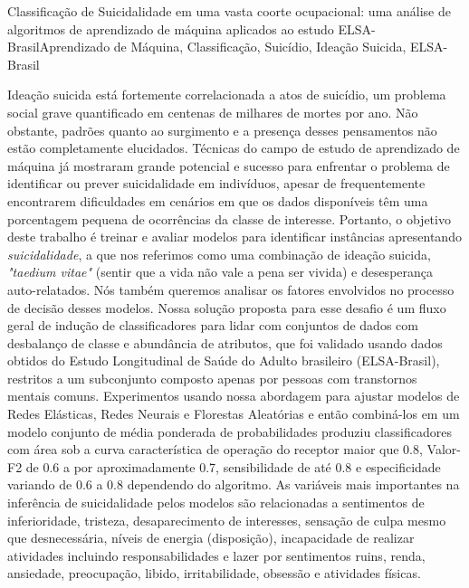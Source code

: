 \documentclass[ecp,tc,english]{iiufrgs}
\begin{document}
    \begin{englishabstract}{Classificação de Suicidalidade em uma vasta coorte ocupacional: uma análise de algoritmos de aprendizado de máquina aplicados ao estudo ELSA-Brasil}{Aprendizado de Máquina, Classificação, Suicídio, Ideação Suicida, ELSA-Brasil}

        Ideação suicida está fortemente correlacionada a atos de suicídio, um problema social grave quantificado em centenas de milhares de mortes por ano.
        Não obstante, padrões quanto ao surgimento e a presença desses pensamentos não estão completamente elucidados.
        Técnicas do campo de estudo de aprendizado de máquina já mostraram grande potencial e sucesso para enfrentar o problema de identificar ou prever suicidalidade em indivíduos, apesar de frequentemente encontrarem dificuldades em cenários em que os dados disponíveis têm uma porcentagem pequena de ocorrências da classe de interesse.
        Portanto, o objetivo deste trabalho é treinar e avaliar modelos para identificar instâncias apresentando \textit{suicidalidade}, a que nos referimos como uma combinação de ideação suicida, \textit{"taedium vitae"} (sentir que a vida não vale a pena ser vivida) e desesperança auto-relatados.
        Nós também queremos analisar os fatores envolvidos no processo de decisão desses modelos.
        Nossa solução proposta para esse desafio é um fluxo geral de indução de classificadores para lidar com conjuntos de dados com desbalanço de classe e abundância de atributos, que foi validado usando dados obtidos do Estudo Longitudinal de Saúde do Adulto brasileiro (ELSA-Brasil), restritos a um subconjunto composto apenas por pessoas com transtornos mentais comuns.
        Experimentos usando nossa abordagem para ajustar modelos de Redes Elásticas, Redes Neurais e Florestas Aleatórias e então combiná-los em um modelo conjunto de média ponderada de probabilidades produziu classificadores com área sob a curva característica de operação do receptor maior que 0.8, Valor-F2 de 0.6 a por aproximadamente 0.7, sensibilidade de até 0.8 e especificidade variando de 0.6 a 0.8 dependendo do algoritmo.
        As variáveis mais importantes na inferência de suicidalidade pelos modelos são relacionadas a sentimentos de inferioridade, tristeza, desaparecimento de interesses, sensação de culpa mesmo que desnecessária, níveis de energia (disposição), incapacidade de realizar atividades incluindo responsabilidades e lazer por sentimentos ruins, renda, ansiedade, preocupação, libido, irritabilidade, obsessão e atividades físicas.
    \end{englishabstract}
\end{document}
